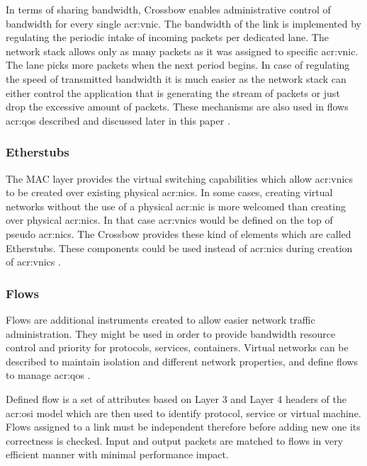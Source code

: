 \documentclass[11pt,openany]{book}
\begin{document}
          In terms of sharing bandwidth, Crossbow enables administrative control of bandwidth for every single
          \gls{acr:vnic}. The bandwidth of the link is implemented by regulating the periodic intake of incoming packets
          per dedicated lane. The network stack allows only as many packets as it was assigned to specific
          \gls{acr:vnic}. The lane picks more packets when the next period begins. In case of regulating the speed of
          transmitted bandwidth it is much easier as the network stack can either control the application that is
          generating the stream of packets or just drop the excessive amount of packets. These mechanisms are also used
          in flows \gls{acr:qos} described and discussed later in this paper \cite{crossbow}.


        \subsubsection{Etherstubs}

          The MAC layer provides the virtual switching capabilities which allow \gls{acr:vnic}s to be created over
          existing physical \gls{acr:nic}s. In some cases, creating virtual networks without the use of a physical
          \gls{acr:nic} is more welcomed than creating over physical \gls{acr:nic}s. In that case \gls{acr:vnic}s would
          be defined on the top of pseudo \gls{acr:nic}s.  The Crossbow provides these kind of elements which are called
          Etherstubs. These components could be used instead of \gls{acr:nic}s during creation of \gls{acr:vnic}s
          \cite{crossbow}.


        \subsubsection{Flows}

          Flows are additional instruments created to allow easier network traffic administration. They might be used in
          order to provide bandwidth resource control and priority for protocols, services, containers. Virtual networks
          can be described to maintain isolation and different network properties, and define flows to manage
          \gls{acr:qos} \cite{network_virtualization}.

          Defined flow is a set of attributes based on Layer 3 and Layer 4 headers of the \gls{acr:osi} model which are
          then used to identify protocol, service or virtual machine. Flows assigned to a link must be independent
          therefore before adding new one its correctness is checked. Input and output packets are matched to flows in
          very efficient manner with minimal performance impact.
\end{document}
